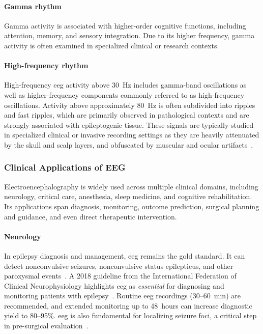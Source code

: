\paragraph*{Gamma rhythm}
Gamma activity is associated with higher-order cognitive functions, including attention, memory, and sensory integration. Due to its higher frequency, gamma activity is often examined in specialized clinical or research contexts.

\paragraph*{High-frequency rhythm}
High-frequency \gls{eeg} activity above 30~Hz includes gamma-band oscillations as well as higher-frequency components commonly referred to as high-frequency oscillations.
Activity above approximately 80~Hz is often subdivided into ripples and fast ripples, which are primarily observed in pathological contexts and are strongly associated
with epileptogenic tissue. These signals are typically studied in specialized clinical or invasive recording settings as they are heavily attenuated by the skull and scalp
layers, and obfuscated by muscular and ocular artifacts~\cite{FREEMAN20031053, nayak-2025}.


\subsubsection{Clinical Applications of EEG}
Electroencephalography is widely used across multiple clinical domains, including neurology, critical care, anesthesia, sleep medicine, and cognitive rehabilitation. Its applications span diagnosis, monitoring, outcome prediction, surgical planning and guidance, and even direct therapeutic intervention.

\paragraph*{Neurology}
In epilepsy diagnosis and management, \gls{eeg} remains the gold standard. It can detect nonconvulsive seizures, nonconvulsive status epilepticus, and other paroxysmal events~\cite{herman-2015}. A 2018 guideline from the International Federation of Clinical Neurophysiology highlights \gls{eeg} as \textit{essential} for diagnosing and monitoring patients with epilepsy~\cite{tatum-2018}. Routine \gls{eeg} recordings (30–60~min) are recommended, and extended monitoring up to 48~hours can increase diagnostic yield to 80–95\%. \gls{eeg} is also fundamental for localizing seizure foci, a critical step in pre-surgical evaluation~\cite{herman-2015}.

